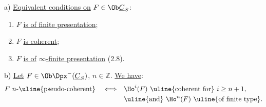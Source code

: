 a) \uline{Equivalent conditions on} \(F\in\Ob\underline{C}_S\):
\begin{enumerate}[label=(\roman*)]
\item \(F\) \uline{is of finite presentation};
\item \(F\) \uline{is coherent};
\item \(F\) \uline{is of} \(\infty\)\uline{-finite presentation} (2.8).
\end{enumerate}

b) \uline{Let} \(F\in\Ob\Dpx^-(\underline{C}_S)\), \(n\in\mathbb Z\). \uline{We have}:
\[
\begin{split}
F\ n\text{-\uline{pseudo-coherent}}
\quad\Longleftrightarrow\quad&
\Ho^i(F)\text{ \uline{coherent for} }i\geq n+1,\\
&\text{\uline{and} }\Ho^n(F)\text{ \uline{of finite type}.}
\end{split}
\]
